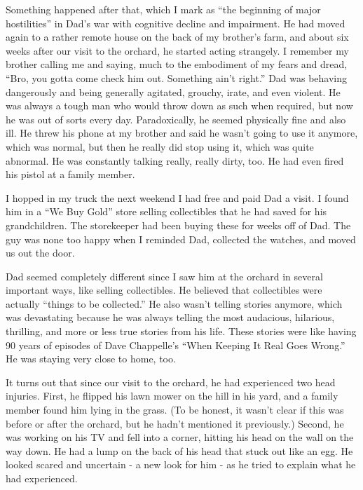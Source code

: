 \documentclass{article}
\begin{document}
Something happened after that, which I mark as ``the beginning of major hostilities'' in Dad's war with cognitive decline and impairment. He had moved again to a rather remote house on the back of my brother's farm, and about six weeks after our visit to the orchard, he started acting strangely. I remember my brother calling me and saying, much to the embodiment of my fears and dread, ``Bro, you gotta come check him out. Something ain't right.'' Dad was behaving dangerously and being generally agitated, grouchy, irate, and even violent. He was always a tough man who would throw down as such when required, but now he was out of sorts every day. Paradoxically, he seemed physically fine and also ill. He threw his phone at my brother and said he wasn't going to use it anymore, which was normal, but then he really did stop using it, which was quite abnormal. He was constantly talking really, really dirty, too. He had even fired his pistol at a family member.

I hopped in my truck the next weekend I had free and paid Dad a visit. I found him in a ``We Buy Gold'' store selling collectibles that he had saved for his grandchildren. The storekeeper had been buying these for weeks off of Dad. The guy was none too happy when I reminded Dad, collected the watches, and moved us out the door.

Dad seemed completely different since I saw him at the orchard in several important ways, like selling collectibles. He believed that collectibles were actually ``things to be collected.'' He also wasn't telling stories anymore, which was devastating because he was always telling the most audacious, hilarious, thrilling, and more or less true stories from his life. These stories were like having 90 years of episodes of Dave Chappelle's ``When Keeping It Real Goes Wrong.'' He was staying very close to home, too.

It turns out that since our visit to the orchard, he had experienced two head injuries. First, he flipped his lawn mower on the hill in his yard, and a family member found him lying in the grass. (To be honest, it wasn't clear if this was before or after the orchard, but he hadn't mentioned it previously.) Second, he was working on his TV and fell into a corner, hitting his head on the wall on the way down. He had a lump on the back of his head that stuck out like an egg. He looked scared and uncertain - a new look for him - as he tried to explain what he had experienced. 
\end{document}
